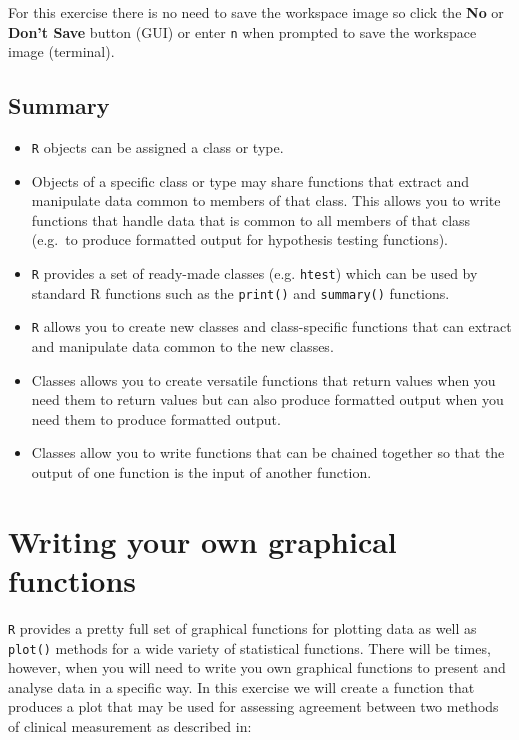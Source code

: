 \documentclass[12pt,a4paper]{book}
\theoremstyle{definition}
\theoremstyle{definition}
\theoremstyle{definition}
\theoremstyle{remark}
\begin{document}
For this exercise there is no need to save the workspace image so click
the \textbf{No} or \textbf{Don't Save} button (GUI) or enter \texttt{n}
when prompted to save the workspace image (terminal).

\hypertarget{summary-5}{%
\section{Summary}\label{summary-5}}

\begin{itemize}
\item
  \texttt{R} objects can be assigned a class or type.
\item
  Objects of a specific class or type may share functions that extract
  and manipulate data common to members of that class. This allows you
  to write functions that handle data that is common to all members of
  that class (e.g.~to produce formatted output for hypothesis testing
  functions).
\item
  \texttt{R} provides a set of ready-made classes (e.g. \texttt{htest})
  which can be used by standard R functions such as the \texttt{print()}
  and \texttt{summary()} functions.
\item
  \texttt{R} allows you to create new classes and class-specific
  functions that can extract and manipulate data common to the new
  classes.
\item
  Classes allows you to create versatile functions that return values
  when you need them to return values but can also produce formatted
  output when you need them to produce formatted output.
\item
  Classes allow you to write functions that can be chained together so
  that the output of one function is the input of another function.
\end{itemize}

\hypertarget{exercise7}{%
\chapter{Writing your own graphical functions}\label{exercise7}}

\texttt{R} provides a pretty full set of graphical functions for
plotting data as well as \texttt{plot()} methods for a wide variety of
statistical functions. There will be times, however, when you will need
to write you own graphical functions to present and analyse data in a
specific way. In this exercise we will create a function that produces a
plot that may be used for assessing agreement between two methods of
clinical measurement as described in:
\end{document}
